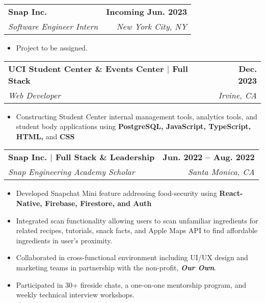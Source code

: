\documentclass[letterpaper,11pt]{article}
\makeatletter
\newcommand{\resumeItem}[1]{
  \item\small{
    {#1 \vspace{-2pt}}
  }
}
\newcommand{\resumeSubheading}[4]{
  \vspace{-2pt}\item
    \begin{tabular*}{1.0\textwidth}[t]{l@{\extracolsep{\fill}}r}
      \textbf{#1} & \textbf{\small #2} \\
      \textit{\small#3} & \textit{\small #4} \\
    \end{tabular*}\vspace{-7pt}
}
\newcommand{\resumeItemListStart}{\begin{itemize}}
\newcommand{\resumeItemListEnd}{\end{itemize}\vspace{-5pt}}
\makeatother
\begin{document}
\resumeSubheading
{Snap Inc.}{Incoming Jun. 2023}
{Software Engineer Intern}{New York City, NY}
\resumeItemListStart
\resumeItem{Project to be assigned.}
\resumeItemListEnd


\resumeSubheading
{UCI Student Center \& Events Center $|$ Full Stack}{Dec. 2023}
{Web Developer}{Irvine, CA}
\resumeItemListStart
\resumeItem{Constructing Student Center internal management tools, analytics tools, and student body applications using \textbf{PostgreSQL, JavaScript, TypeScript, HTML,} and \textbf{CSS}}

\resumeItemListEnd





\resumeSubheading
{Snap Inc. $|$ Full Stack \& Leadership}{ Jun. 2022 -- Aug. 2022}
{Snap Engineering Academy Scholar}{Santa Monica, CA}
\resumeItemListStart
\resumeItem {
Developed Snapchat Mini feature addressing food-security using \textbf{React-Native, Firebase, Firestore, and Auth}}
\resumeItem{ Integrated scan functionality allowing users to scan unfamiliar ingredients for related recipes, tutorials, snack facts, and Apple Maps API to find affordable ingredients in user's proximity.}
\resumeItem{
Collaborated in cross-functional environment including UI/UX design and marketing teams in partnership with the non-profit, \textbf{\textit{Our Own}}. }
\resumeItem{ Participated in 30+ fireside chats, a one-on-one mentorship program, and weekly technical interview workshops.}
\resumeItemListEnd
\end{document}

